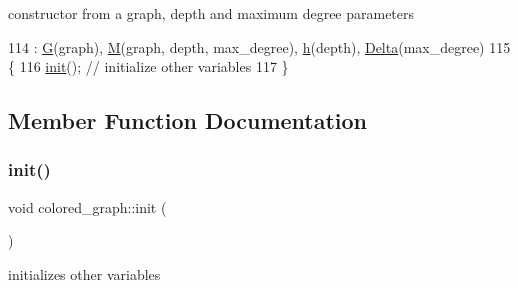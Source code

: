 constructor from a graph, depth and maximum degree parameters 


\begin{DoxyCode}
114                                                                     : \hyperlink{classcolored__graph_a39186b56cad58c368d6947656976e18d}{G}(graph), 
      \hyperlink{classcolored__graph_ab72c568fe12f7c849ca6bffb145aec47}{M}(graph, depth, max\_degree), \hyperlink{classcolored__graph_ae27062a4ee59df2670d3a0c81e85a3fa}{h}(depth), \hyperlink{classcolored__graph_a5b0e93eb40a20dc815c809dee11edc12}{Delta}(max\_degree)
115   \{
116     \hyperlink{classcolored__graph_a463f9f010d6124df8d03b4f7649a130d}{init}(); \textcolor{comment}{// initialize other variables }
117   \}
\end{DoxyCode}


\subsection{Member Function Documentation}
\mbox{\label{classcolored__graph_a463f9f010d6124df8d03b4f7649a130d}} 
\subsubsection{\texorpdfstring{init()}{init()}}
{\footnotesize\ttfamily void colored\+\_\+graph\+::init (\begin{DoxyParamCaption}{ }\end{DoxyParamCaption})}



initializes other variables 


